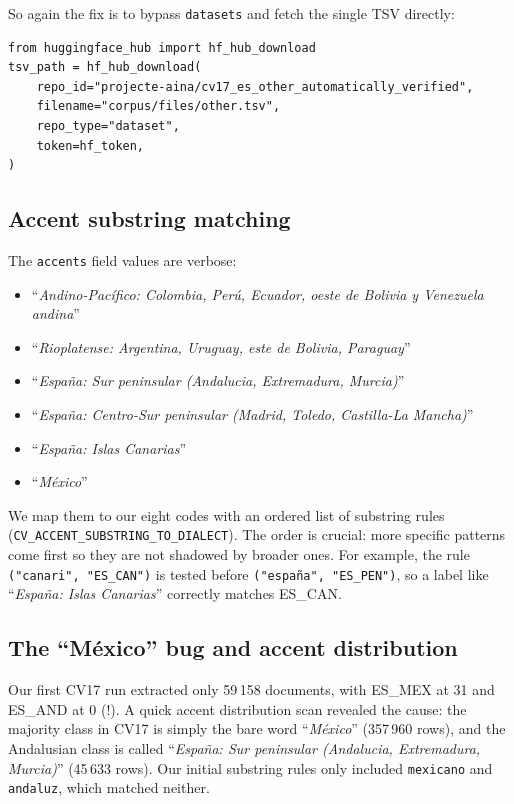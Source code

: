 \documentclass[11pt,a4paper]{article}
\begin{document}
So again the fix is to bypass \texttt{datasets} and fetch the single TSV
directly:

\begin{lstlisting}[style=pycode,caption={CV17 direct TSV access.}]
from huggingface_hub import hf_hub_download
tsv_path = hf_hub_download(
    repo_id="projecte-aina/cv17_es_other_automatically_verified",
    filename="corpus/files/other.tsv",
    repo_type="dataset",
    token=hf_token,
)
\end{lstlisting}

\subsection{Accent substring matching}

The \texttt{accents} field values are verbose:
\begin{itemize}
  \item ``\emph{Andino-Pacífico: Colombia, Perú, Ecuador, oeste de
        Bolivia y Venezuela andina}''
  \item ``\emph{Rioplatense: Argentina, Uruguay, este de Bolivia,
        Paraguay}''
  \item ``\emph{España: Sur peninsular (Andalucia, Extremadura, Murcia)}''
  \item ``\emph{España: Centro-Sur peninsular (Madrid, Toledo, Castilla-La
        Mancha)}''
  \item ``\emph{España: Islas Canarias}''
  \item ``\emph{México}''
\end{itemize}

We map them to our eight codes with an ordered list of substring rules
(\texttt{CV\_ACCENT\_SUBSTRING\_TO\_DIALECT}). The order is crucial: more
specific patterns come first so they are not shadowed by broader ones.
For example, the rule \texttt{("canari", "ES\_CAN")} is tested before
\texttt{("españa", "ES\_PEN")}, so a label like ``\emph{España: Islas
Canarias}'' correctly matches ES\_CAN.

\subsection{The ``México'' bug and accent distribution}

Our first CV17 run extracted only 59\,158 documents, with ES\_MEX at 31
and ES\_AND at 0 (!). A quick accent distribution scan revealed the
cause: the majority class in CV17 is simply the bare word ``\emph{México}''
(357\,960 rows), and the Andalusian class is called ``\emph{España: Sur
peninsular (Andalucia, Extremadura, Murcia)}'' (45\,633 rows). Our
initial substring rules only included \texttt{mexicano} and
\texttt{andaluz}, which matched neither.
\end{document}
